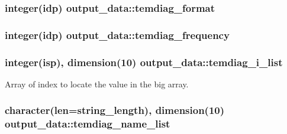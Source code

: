\subsubsection[{\texorpdfstring{temdiag\+\_\+format}{temdiag_format}}]{\setlength{\rightskip}{0pt plus 5cm}integer(idp) output\+\_\+data\+::temdiag\+\_\+format}\hypertarget{namespaceoutput__data_a2f4ce5fdd4011f5db5c6b9de97cf133a}{}\label{namespaceoutput__data_a2f4ce5fdd4011f5db5c6b9de97cf133a}
\subsubsection[{\texorpdfstring{temdiag\+\_\+frequency}{temdiag_frequency}}]{\setlength{\rightskip}{0pt plus 5cm}integer(idp) output\+\_\+data\+::temdiag\+\_\+frequency}\hypertarget{namespaceoutput__data_ab55f479db67f7b4af32d0a55e2ba6620}{}\label{namespaceoutput__data_ab55f479db67f7b4af32d0a55e2ba6620}
\subsubsection[{\texorpdfstring{temdiag\+\_\+i\+\_\+list}{temdiag_i_list}}]{\setlength{\rightskip}{0pt plus 5cm}integer(isp), dimension(10) output\+\_\+data\+::temdiag\+\_\+i\+\_\+list}\hypertarget{namespaceoutput__data_a272ff12d370f1ddd453ed84e0aea955b}{}\label{namespaceoutput__data_a272ff12d370f1ddd453ed84e0aea955b}


Array of index to locate the value in the big array. 

\subsubsection[{\texorpdfstring{temdiag\+\_\+name\+\_\+list}{temdiag_name_list}}]{\setlength{\rightskip}{0pt plus 5cm}character(len=string\+\_\+length), dimension(10) output\+\_\+data\+::temdiag\+\_\+name\+\_\+list}\hypertarget{namespaceoutput__data_a891f4f8be197dbbfe91c01ee5260b4c2}{}\label{namespaceoutput__data_a891f4f8be197dbbfe91c01ee5260b4c2}


